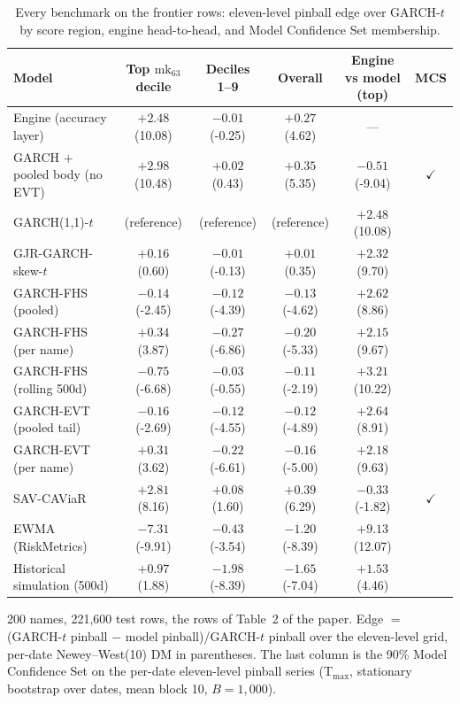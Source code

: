 \documentclass[11pt]{article}
\begin{document}
\begin{table}[htbp]
\centering
\begin{threeparttable}
\caption{Every benchmark on the frontier rows: eleven-level pinball edge over GARCH-$t$ by score region, engine head-to-head, and Model Confidence Set membership.}
\label{tab:bench-pinball}
\footnotesize
\begin{tabular}{lccccc}
\toprule
Model & Top $\mathrm{mk}_{63}$ decile & Deciles 1--9 & Overall & Engine vs model (top) & MCS \\
\midrule
Engine (accuracy layer) & $+2.48$ (10.08) & $-0.01$ (-0.25) & $+0.27$ (4.62) & --- &  \\
GARCH $+$ pooled body (no EVT) & $+2.98$ (10.48) & $+0.02$ (0.43) & $+0.35$ (5.35) & $-0.51$ (-9.04) & $\checkmark$ \\
GARCH(1,1)-$t$ & (reference) & (reference) & (reference) & $+2.48$ (10.08) &  \\
GJR-GARCH-skew-$t$ & $+0.16$ (0.60) & $-0.01$ (-0.13) & $+0.01$ (0.35) & $+2.32$ (9.70) &  \\
GARCH-FHS (pooled) & $-0.14$ (-2.45) & $-0.12$ (-4.39) & $-0.13$ (-4.62) & $+2.62$ (8.86) &  \\
GARCH-FHS (per name) & $+0.34$ (3.87) & $-0.27$ (-6.86) & $-0.20$ (-5.33) & $+2.15$ (9.67) &  \\
GARCH-FHS (rolling 500d) & $-0.75$ (-6.68) & $-0.03$ (-0.55) & $-0.11$ (-2.19) & $+3.21$ (10.22) &  \\
GARCH-EVT (pooled tail) & $-0.16$ (-2.69) & $-0.12$ (-4.55) & $-0.12$ (-4.89) & $+2.64$ (8.91) &  \\
GARCH-EVT (per name) & $+0.31$ (3.62) & $-0.22$ (-6.61) & $-0.16$ (-5.00) & $+2.18$ (9.63) &  \\
SAV-CAViaR & $+2.81$ (8.16) & $+0.08$ (1.60) & $+0.39$ (6.29) & $-0.33$ (-1.82) & $\checkmark$ \\
EWMA (RiskMetrics) & $-7.31$ (-9.91) & $-0.43$ (-3.54) & $-1.20$ (-8.39) & $+9.13$ (12.07) &  \\
Historical simulation (500d) & $+0.97$ (1.88) & $-1.98$ (-8.39) & $-1.65$ (-7.04) & $+1.53$ (4.46) &  \\
\bottomrule
\end{tabular}
\begin{tablenotes}\footnotesize
\item 200 names, 221,600 test rows, the rows of Table~2 of the paper. Edge $=$ (GARCH-$t$ pinball $-$ model pinball)/GARCH-$t$ pinball over the eleven-level grid, per-date Newey--West(10) DM in parentheses. The last column is the 90\% Model Confidence Set on the per-date eleven-level pinball series (T$_{\max}$, stationary bootstrap over dates, mean block 10, $B=1{,}000$).
\end{tablenotes}
\end{threeparttable}
\end{table}
\end{document}
